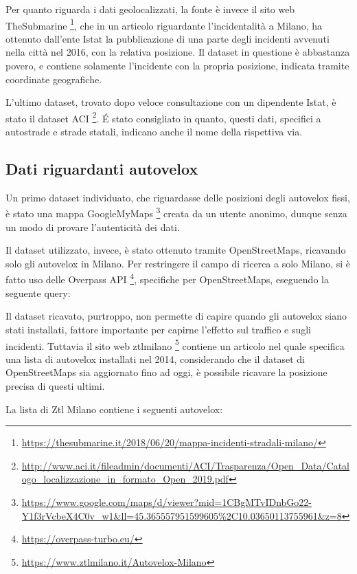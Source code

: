 \documentclass[a4paper]{report}
\begin{document}
Per quanto riguarda i dati geolocalizzati, 
la fonte è invece il sito web TheSubmarine
\footnote{\url{https://thesubmarine.it/2018/06/20/mappa-incidenti-stradali-milano/}},
che in un articolo riguardante l'incidentalità a Milano, 
ha ottenuto dall'ente Istat la pubblicazione di una parte degli 
incidenti avvenuti nella città nel 2016, con la relativa posizione.
Il dataset in questione è abbastanza povero, e contiene solamente l'incidente con la 
propria posizione, indicata tramite coordinate geografiche.

L'ultimo dataset, trovato dopo veloce consultazione con un dipendente Istat, è stato il dataset ACI
\footnote{\url{http://www.aci.it/fileadmin/documenti/ACI/Trasparenza/Open_Data/Catalogo_localizzazione_in_formato_Open_2019.pdf}}.
\'E stato consigliato in quanto, questi dati, specifici a autostrade e strade statali, 
indicano anche il nome della rispettiva via.

\subsection{Dati riguardanti autovelox}
Un primo dataset individuato, che riguardasse delle posizioni degli autovelox fissi, 
è stato una mappa GoogleMyMaps
\footnote{\url{https://www.google.com/maps/d/viewer?mid=1CBgMTvIDnbGo22-Y1f3rVcbeX4C0v_w1&ll=45.365557951599605\%2C10.03650113755961&z=8}} 
creata da un utente anonimo, dunque senza un modo di provare l'autenticità dei dati.

Il dataset utilizzato, invece, è stato ottenuto tramite OpenStreetMaps, ricavando solo gli autovelox 
in Milano. 
Per restringere il campo di ricerca a solo Milano, si è fatto uso delle Overpass API
\footnote{\url{https://overpass-turbo.eu/}}, 
specifiche per OpenStreetMaps, eseguendo la seguente query: 



Il dataset ricavato, purtroppo, non permette di capire quando gli autovelox siano stati 
installati, fattore importante per capirne l'effetto sul traffico e sugli incidenti.
Tuttavia il sito web ztlmilano
\footnote{\url{https://www.ztlmilano.it/Autovelox-Milano}} 
contiene un articolo nel quale specifica una lista di 
autovelox installati nel 2014, considerando che il dataset di OpenStreetMaps sia aggiornato 
fino ad oggi, è possibile ricavare la posizione precisa di questi ultimi.

La lista di Ztl Milano contiene i seguenti autovelox: 
\end{document}
